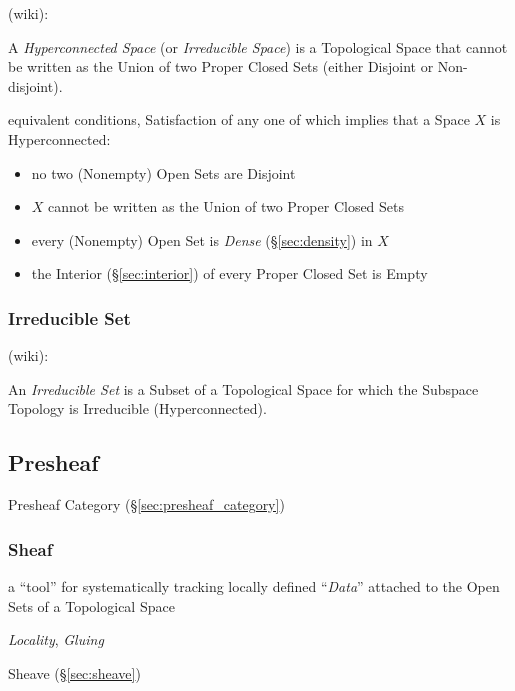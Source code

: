 (wiki):

A \emph{Hyperconnected Space} (or \emph{Irreducible Space}) is a Topological
Space that cannot be written as the Union of two Proper Closed Sets (either
Disjoint or Non-disjoint).

equivalent conditions, Satisfaction of any one of which implies that a Space
$X$ is Hyperconnected:
\begin{itemize}
  \item no two (Nonempty) Open Sets are Disjoint
  \item $X$ cannot be written as the Union of two Proper Closed Sets
  \item every (Nonempty) Open Set is \emph{Dense} (\S\ref{sec:density}) in $X$
  \item the Interior (\S\ref{sec:interior}) of every Proper Closed Set is Empty
\end{itemize}



\subsubsection{Irreducible Set}\label{sec:irreducible_set}

(wiki):

An \emph{Irreducible Set} is a Subset of a Topological Space for which the
Subspace Topology is Irreducible (Hyperconnected).



\subsection{Presheaf}\label{sec:presheaf}

Presheaf Category (\S\ref{sec:presheaf_category})



\subsubsection{Sheaf}\label{sec:sheaf}

a ``tool'' for systematically tracking locally defined ``\emph{Data}'' attached
to the Open Sets of a Topological Space

\emph{Locality}, \emph{Gluing}

Sheave (\S\ref{sec:sheave})



